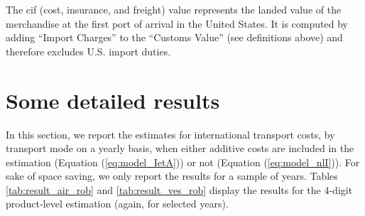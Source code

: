 \documentclass[a4paper,11pt]{article}
\begin{document}
The cif (cost, insurance, and freight) value represents the landed value of the merchandise at the first port of arrival in the United States. It is computed by adding ``Import Charges'' to the ``Customs Value'' (see definitions above) and therefore excludes U.S. import duties.

\section{Some detailed results \label{app:more_results}}

In this section, we report the estimates for international transport costs, by transport mode on a yearly basis, when either additive costs are included in the estimation (Equation (\ref{eq:model_IetA})) or not (Equation (\ref{eq:model_nlI})). For sake of space saving, we only report the results for a sample of years. Tables \ref{tab:result_air_rob} and \ref{tab:result_ves_rob} display the results for the 4-digit product-level estimation (again, for selected years).
\end{document}
